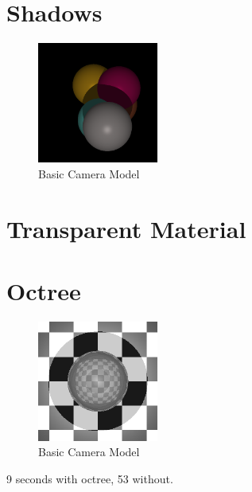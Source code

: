 \documentclass{article}
\begin{document}
\section{Shadows}

\begin{figure}[H]
  \begin{center}
  \includegraphics[width=150px]{Images/shadows.png}
  \caption{Basic Camera Model}
  \label{fig:basiccammod}
  \end{center}
\end{figure}

\section{Transparent Material}

\section{Octree}

\begin{figure}[H]
  \begin{center}
  \includegraphics[width=150px]{Images/octreeTest.png}
  \caption{Basic Camera Model}
  \label{fig:basiccammod}
  \end{center}
\end{figure}

9 seconds with octree, 53 without.



\end{document}
